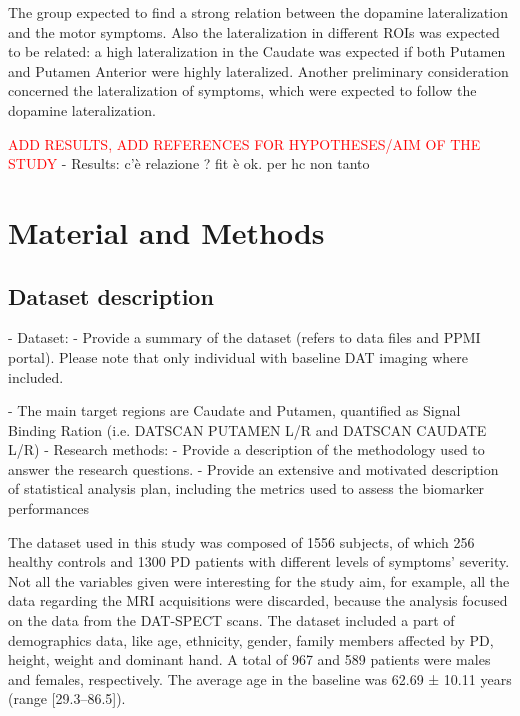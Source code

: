 \documentclass[]{article}
\begin{document}
\begin{multicols}{2}
\newline
The group expected to find a strong relation between the dopamine lateralization and the motor symptoms. Also the lateralization in different ROIs was expected to be related: a high lateralization in the Caudate was expected if both Putamen and Putamen Anterior were highly lateralized. Another preliminary consideration concerned the lateralization of symptoms, which were expected to follow the dopamine lateralization. 

\textcolor{red}{ADD RESULTS, ADD REFERENCES FOR HYPOTHESES/AIM OF THE STUDY}
- Results: c'è relazione ? fit è ok. per hc non tanto

\section{Material and Methods}

\subsection{Dataset description}

- Dataset:
\newline
	- Provide a summary of the dataset (refers to data files and PPMI
	portal). Please note that only individual with baseline DAT imaging 
	where included.
\newline

	- The main target regions are Caudate and Putamen, quantified as 
	Signal Binding Ration (i.e. DATSCAN PUTAMEN L/R and 
	DATSCAN CAUDATE L/R)
\newline
- Research methods:
\newline
	- Provide a description of the methodology used to answer the research 
	questions. 
	\newline
	- Provide an extensive and motivated description of statistical analysis plan, including the metrics used to assess the biomarker 
	performances
	
The dataset used in this study was composed of 1556 subjects, of which 256 healthy controls and 1300 PD patients with different levels of symptoms' severity. Not all the variables given were interesting for the study aim, for example, all the data regarding the MRI acquisitions were discarded, because the analysis focused on the data from the DAT-SPECT scans. 
\newline
The dataset included a part of demographics data, like age, ethnicity, gender, family members affected by PD, height, weight and dominant hand.
A total of 967 and 589 patients were males and females, respectively. The average age in the baseline was 62.69 ± 10.11 years (range [29.3–86.5]). 


\end{multicols}
\end{document}

